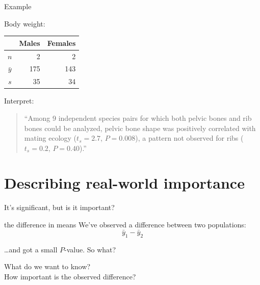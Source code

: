 \begin{frame}{Example}

  Body weight:
  \begin{center}
    \begin{tabular}{crr}
       & Males & Females \\
       \hline
       $n$ & 2 & 2 \\
       $\bar y$ & 175 & 143 \\
       $s$ & 35 & 34
     \end{tabular}

   \vspace{2em}

   \end{center}

\end{frame}


\begin{frame}{Interpret:}

  \begin{quote}
    ``Among 9 independent species pairs for which both pelvic bones and rib bones could be analyzed, pelvic bone shape was positively correlated with mating ecology ($t_s=2.7$, $P=0.008$), a pattern not observed for ribs ($t_s=0.2$, $P=0.40$).''
  \end{quote}

\end{frame}



\section{Describing real-world importance}


\begin{frame}{It's significant, but is it important?}


    \begin{block}{the difference in means}
        We've observed a difference between two populations:
        \[  \bar y_1 - \bar y_2 \]
    \end{block}

    \ldots and got a small $P$-value.  So what?

    \vspace{2em}

     What do we want to know?\\
    How important is the observed difference?


\end{frame}


